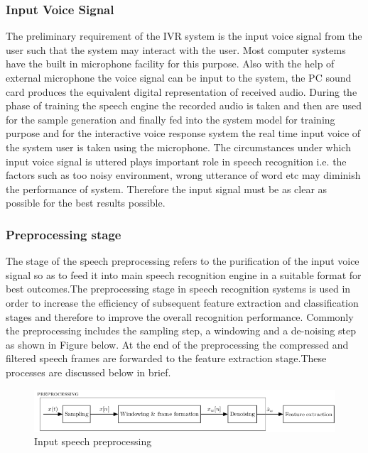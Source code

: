 \subsubsection{Input Voice Signal}
The preliminary requirement of the IVR system is the input voice signal from the user such that the system may interact with the user. Most computer systems have the built in microphone facility for this purpose. Also with the help of external microphone the voice signal can be input to the system, the PC sound card produces the equivalent digital representation of received audio. During the phase of training the speech engine the recorded audio is taken and then are used for the sample generation and finally fed into the system model for training purpose and for the interactive voice response system the real time input voice of the system user is taken using the microphone. The circumstances under which input voice signal is uttered plays important role in speech recognition i.e. the factors such as too noisy environment, wrong utterance of word etc may diminish the performance of system. Therefore the input signal must be as clear as possible for the best results possible.

\subsubsection{Preprocessing stage}
The stage of the speech preprocessing refers to the purification of the input voice signal so as to feed it into main speech recognition engine in a suitable format for best outcomes.The preprocessing stage in speech recognition systems is used in order to increase the efficiency of subsequent feature extraction and classification stages and therefore to improve the overall recognition performance. Commonly the preprocessing includes the sampling step, a windowing and a de-noising step as shown in Figure below. At the end of the preprocessing the compressed and filtered speech frames are forwarded to the feature extraction stage.These processes are discussed below in brief.
\begin{figure} [h]
	\begin{center}
		\includegraphics[scale=0.8]{images/prepro.png}
		\caption{Input speech preprocessing}
	\end{center}
\end{figure}

